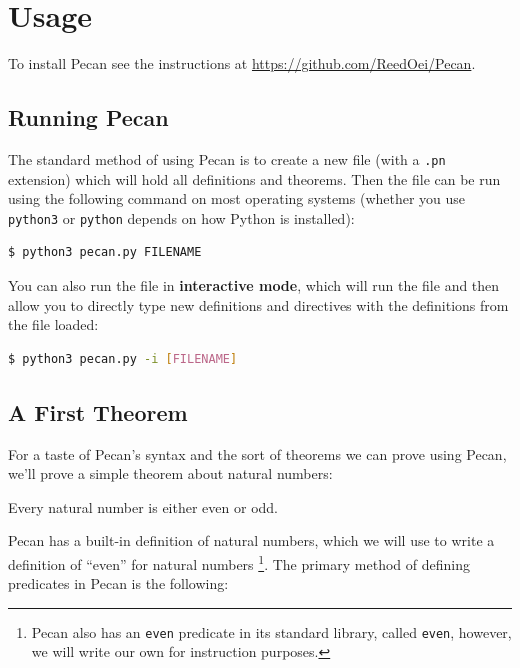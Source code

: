 
\section{Usage}\label{sec:usage}

To install Pecan see the instructions at \url{https://github.com/ReedOei/Pecan}.

\subsection{Running Pecan}

The standard method of using Pecan is to create a new file (with a \texttt{.pn} extension) which will hold all definitions and theorems.
Then the file can be run using the following command on most operating systems (whether you use \texttt{python3} or \texttt{python} depends on how Python is installed):

\begin{lstlisting}[language=bash, basicstyle=\normalsize\ttfamily]
$ python3 pecan.py FILENAME
\end{lstlisting}

You can also run the file in \textbf{interactive mode}, which will run the file and then allow you to directly type new definitions and directives with the definitions from the file loaded:

\begin{lstlisting}[language=bash, basicstyle=\normalsize\ttfamily]
$ python3 pecan.py -i [FILENAME]
\end{lstlisting}

\subsection{A First Theorem}

For a taste of Pecan's syntax and the sort of theorems we can prove using Pecan, we'll prove a simple theorem about natural numbers:

\begin{theorem}
Every natural number is either even or odd.
\end{theorem}

Pecan has a built-in definition of natural numbers, which we will use to write a definition of ``even'' for natural numbers \footnote{Pecan also has an \texttt{even} predicate in its standard library, called \texttt{even}, however, we will write our own for instruction purposes.}.
The primary method of defining predicates in Pecan is the following:

